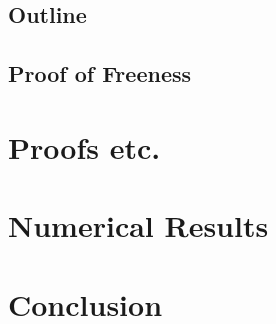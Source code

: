\documentclass[12pt,a4paper]{report}
\begin{document}
\section{Outline}



\section{Proof of Freeness}


\chapter{Proofs etc. }\label{Results}

\chapter{Numerical Results}\label{numerical}

\chapter{Conclusion}


\end{document}
